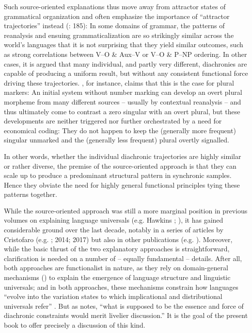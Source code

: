 \documentclass[output=paper]{langsci/langscibook}
\begin{document}
Such source-oriented explanations thus move away from attractor states of grammatical organization and often emphasize the importance of “attractor trajectories” instead (\citealt{BybeeBeckner2015}: 185): In some domains of grammar, the patterns of reanalysis and ensuing grammaticalization are so strikingly similar across the world’s languages that it is not surprising that they yield similar outcomes, such as strong correlations between V–O \& Aux–V or V–O \& P–NP ordering. In other cases, it is argued that many individual, and partly very different, diachronies are capable of producing a uniform result, but without any consistent functional force driving these trajectories. \citet{Cristofaro2017}, for instance, claims that this is the case for plural markers: An initial system without number marking can develop an overt plural morpheme from many different sources – usually by contextual reanalysis – and thus ultimately come to contrast a zero singular with an overt plural, but these developments are neither triggered nor further orchestrated by a need for economical coding: They do not happen to keep the (generally more frequent) singular unmarked and the (generally less frequent) plural overtly signalled. 

In other words, whether the individual diachronic trajectories are highly similar or rather diverse, the premise of the source-oriented approach is that they can scale up to produce a predominant structural pattern in synchronic samples. Hence they obviate the need for highly general functional principles tying these patterns together.

While the source-oriented approach was still a more marginal position in previous volumes on explaining language universals (e.g. Hawkins \citeyear*{Hawkins1988_ExplEd}; \citealt{Good2008_Change}), it has gained considerable ground over the last decade, notably in a series of articles by Cristofaro (e.g. \citealt{Cristofaro2012}; 2014; 2017) but also in other publications (e.g. \citealt{Anderson2016,Creissels2008,GildeaZúñiga2016}). Moreover, while the basic thrust of the two explanatory approaches is straightforward, clarification is needed on a number of – equally fundamental – details. After all, both approaches are functionalist in nature, as they rely on domain-general mechanisms (\citealt{Bybee2010}) to explain the emergence of language structure and linguistic universals; and in both approaches, these mechanisms constrain how languages “evolve into the variation states to which implicational and distributional universals refer” \citep[18]{Hawkins1988_Intro}. But as \citet[51]{Plank2007} notes, “what is supposed to be the essence and force of diachronic constraints would merit livelier discussion.” It is the goal of the present book to offer precisely a discussion of this kind.
\end{document}
